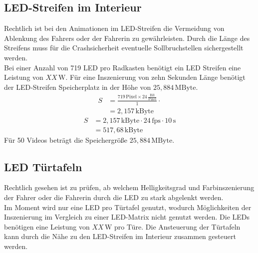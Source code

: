 \subsection{LED-Streifen im Interieur}
Rechtlich ist bei den Animationen im LED-Streifen die Vermeidung von Ablenkung des Fahrers oder der Fahrerin zu gewährleisten.
Durch die Länge des Streifens muss für die Crashsicherheit eventuelle Sollbruchstellen sichergestellt werden. \\
Bei einer Anzahl von 719 LED pro Radkasten benötigt ein LED Streifen eine Leistung von $ XX\,\mathrm{W} $.
Für eine Inszenierung von zehn Sekunden Länge benötigt der LED-Streifen Speicherplatz in der Höhe von $ 25,884\,\mathrm{MByte}$.
\begin{align}
	S &= \frac{719\,\mathrm{Pixel} \times 24\,\frac{\mathrm{Bit}}{\mathrm{Pixel}}}{1} \cdot \\
	&= 2,157\,\mathrm{kByte}
\end{align}
\begin{align}
	S &= 2,157\,\mathrm{kByte} \cdot 24\,\mathrm{fps} \cdot 10\,\mathrm{s}\\
	&= 517,68\,\mathrm{kByte}
\end{align}
Für 50 Videos beträgt die Speichergröße $ 25,884\,\mathrm{MByte} $.
\subsection{LED Türtafeln}
Rechtlich gesehen ist zu prüfen, ab welchem Helligkeitsgrad und Farbinszenierung der Fahrer oder die Fahrerin durch die LED zu stark abgelenkt werden. \\
Im Moment wird nur eine LED pro Türtafel genutzt, wodurch Möglichkeiten der Inszenierung im Vergleich zu einer LED-Matrix nicht genutzt werden. 
Die LEDs benötigen eine Leistung von $ XX\,\mathrm{W} $ pro Türe.
Die Ansteuerung der Türtafeln kann durch die Nähe zu den LED-Streifen im Interieur zusammen gesteuert werden.
